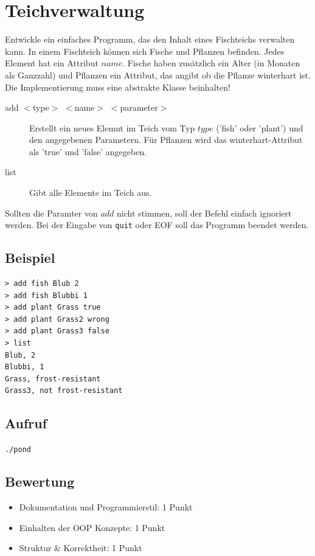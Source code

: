 \documentclass[a4paper,10pt]{article}
\begin{document}
\section*{Teichverwaltung}
Entwickle ein einfaches Programm, das den Inhalt eines Fischteichs verwalten kann. In einem Fischteich können sich Fische und Pflanzen befinden. Jedes Element hat ein Attribut $name$. Fische haben zusätzlich ein Alter (in Monaten als Ganzzahl) und Pflanzen ein Attribut, das angibt ob die Pflanze winterhart ist.\\ Die Implementierung muss eine abstrakte Klasse beinhalten!

\begin{description}
 \item[add $<$type$>$ $<$name$>$ $<$parameter$>$] Erstellt ein neues Elemnt im Teich vom Typ $type$ ('fish' oder 'plant') und den angegebenen Parametern. Für Pflanzen wird das winterhart-Attribut als 'true' und 'false'  angegeben. 
 \item[list] Gibt alle Elemente im Teich aus. 
\end{description}

Sollten die Paramter von $add$ nicht stimmen, soll der Befehl einfach ignoriert werden.
Bei der Eingabe von \texttt{quit} oder EOF soll das Programm beendet werden.


\subsection*{Beispiel}
\begin{verbatim}
> add fish Blub 2
> add fish Blubbi 1
> add plant Grass true
> add plant Grass2 wrong
> add plant Grass3 false
> list
Blub, 2
Blubbi, 1
Grass, frost-resistant
Grass3, not frost-resistant
\end{verbatim}

\subsection*{Aufruf}
\texttt{./pond}

\subsection*{Bewertung}
\begin{itemize}
 \item Dokumentation und Programmierstil: 1 Punkt
 \item Einhalten der OOP Konzepte: 1 Punkt
 \item Struktur \& Korrektheit: 1 Punkt
\end{itemize}

\newpage
\end{document}
